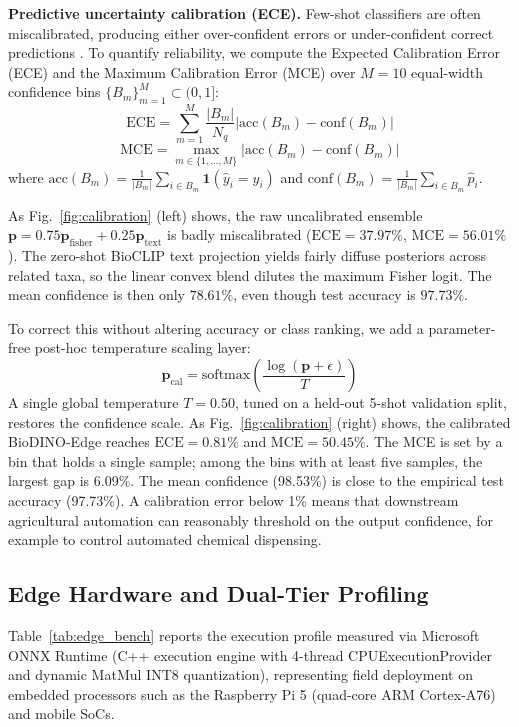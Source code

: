 \documentclass[conference]{IEEEtran}
\begin{document}
\textbf{Predictive uncertainty calibration (ECE).}
Few-shot classifiers are often miscalibrated, producing either over-confident errors or under-confident correct predictions \cite{guo2017calibration}. To quantify reliability, we compute the Expected Calibration Error (ECE) and the Maximum Calibration Error (MCE) over $M=10$ equal-width confidence bins $\{B_m\}_{m=1}^M \subset (0, 1]$:
\begin{equation}
\text{ECE} = \sum_{m=1}^M \frac{|B_m|}{N_q} \left| \text{acc}(B_m) - \text{conf}(B_m) \right|
\end{equation}
\begin{equation}
\text{MCE} = \max_{m \in \{1,\dots,M\}} \left| \text{acc}(B_m) - \text{conf}(B_m) \right|
\end{equation}
where $\text{acc}(B_m) = \frac{1}{|B_m|}\sum_{i \in B_m} \mathbf{1}(\hat{y}_i = y_i)$ and $\text{conf}(B_m) = \frac{1}{|B_m|}\sum_{i \in B_m} \hat{p}_i$.

As Fig.~\ref{fig:calibration} (left) shows, the raw uncalibrated ensemble $\mathbf{p} = 0.75 \mathbf{p}_{\text{fisher}} + 0.25 \mathbf{p}_{\text{text}}$ is badly miscalibrated ($\text{ECE} = 37.97\%$, $\text{MCE} = 56.01\%$). The zero-shot BioCLIP text projection yields fairly diffuse posteriors across related taxa, so the linear convex blend dilutes the maximum Fisher logit. The mean confidence is then only $78.61\%$, even though test accuracy is $97.73\%$.

To correct this without altering accuracy or class ranking, we add a parameter-free post-hoc temperature scaling layer:
\begin{equation}
\mathbf{p}_{\text{cal}} = \text{softmax}\left(\frac{\log(\mathbf{p} + \epsilon)}{T}\right)
\end{equation}
A single global temperature $T = 0.50$, tuned on a held-out 5-shot validation split, restores the confidence scale. As Fig.~\ref{fig:calibration} (right) shows, the calibrated BioDINO-Edge reaches \textbf{$\text{ECE} = \mathbf{0.81\%}$} and $\text{MCE} = 50.45\%$. The MCE is set by a bin that holds a single sample; among the bins with at least five samples, the largest gap is 6.09\%. The mean confidence (98.53\%) is close to the empirical test accuracy (97.73\%). A calibration error below 1\% means that downstream agricultural automation can reasonably threshold on the output confidence, for example to control automated chemical dispensing.

\subsection{Edge Hardware and Dual-Tier Profiling}
Table~\ref{tab:edge_bench} reports the execution profile measured via Microsoft ONNX Runtime (C++ execution engine with 4-thread CPUExecutionProvider and dynamic MatMul INT8 quantization), representing field deployment on embedded processors such as the Raspberry Pi 5 (quad-core ARM Cortex-A76) and mobile SoCs.
\end{document}
